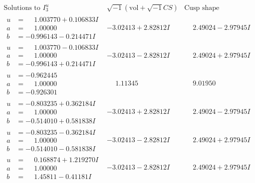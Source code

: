 \documentclass[1p]{elsarticle_modified}
\theoremstyle{definition}
\newcommand{\I}{\sqrt{-1}}
\begin{document}
$$\begin{array}{c|c|c}  
\text{Solutions to }I^u_{3}& \I (\text{vol} + \sqrt{-1}CS) & \text{Cusp shape}\\
 \hline 
\begin{aligned}
u &= \phantom{-}1.003770 + 0.106833 I \\
a &= \phantom{-}1.00000\phantom{ +0.000000I} \\
b &= -0.996143 - 0.214471 I\end{aligned}
 & -3.02413 + 2.82812 I & \phantom{-}2.49024 - 2.97945 I \\ \hline\begin{aligned}
u &= \phantom{-}1.003770 - 0.106833 I \\
a &= \phantom{-}1.00000\phantom{ +0.000000I} \\
b &= -0.996143 + 0.214471 I\end{aligned}
 & -3.02413 - 2.82812 I & \phantom{-}2.49024 + 2.97945 I \\ \hline\begin{aligned}
u &= -0.962445\phantom{ +0.000000I} \\
a &= \phantom{-}1.00000\phantom{ +0.000000I} \\
b &= -0.926301\phantom{ +0.000000I}\end{aligned}
 & \phantom{-}1.11345\phantom{ +0.000000I} & \phantom{-}9.01950\phantom{ +0.000000I} \\ \hline\begin{aligned}
u &= -0.803235 + 0.362184 I \\
a &= \phantom{-}1.00000\phantom{ +0.000000I} \\
b &= -0.514010 + 0.581838 I\end{aligned}
 & -3.02413 + 2.82812 I & \phantom{-}2.49024 - 2.97945 I \\ \hline\begin{aligned}
u &= -0.803235 - 0.362184 I \\
a &= \phantom{-}1.00000\phantom{ +0.000000I} \\
b &= -0.514010 - 0.581838 I\end{aligned}
 & -3.02413 - 2.82812 I & \phantom{-}2.49024 + 2.97945 I \\ \hline\begin{aligned}
u &= \phantom{-}0.168874 + 1.219270 I \\
a &= \phantom{-}1.00000\phantom{ +0.000000I} \\
b &= \phantom{-}1.45811 - 0.41181 I\end{aligned}
 & -3.02413 - 2.82812 I & \phantom{-}2.49024 + 2.97945 I \\ \hline\begin{aligned}

\end{aligned}
\end{array}$$
\end{document}
